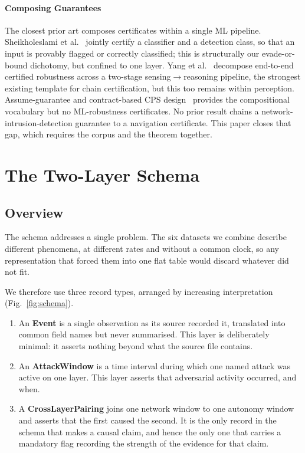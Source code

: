 \paragraph{Composing Guarantees}
The closest prior art composes certificates within a single ML pipeline.
Sheikholeslami et al.~\cite{sheikholeslami2021provably} jointly certify a
classifier and a detection class, so that an input is provably flagged or
correctly classified; this is structurally our evade-or-bound dichotomy, but
confined to one layer. Yang et al.~\cite{yang2022sensing} decompose end-to-end
certified robustness across a two-stage sensing$\to$reasoning pipeline, the
strongest existing template for chain certification, but this too remains within
perception. Assume-guarantee and contract-based CPS design~\cite{pacti2024}
provides the compositional vocabulary but no ML-robustness certificates. No
prior result chains a network-intrusion-detection guarantee to a navigation
certificate. This paper closes that gap, which requires the corpus and the
theorem together.

\section{The Two-Layer Schema}
\label{sec:schema}
\subsection{Overview}
The schema addresses a single problem. The six datasets we combine describe
different phenomena, at different rates and without a common clock, so any
representation that forced them into one flat table would discard whatever did
not fit.

We therefore use three record types, arranged by increasing
interpretation (Fig.~\ref{fig:schema}).

\begin{enumerate}
\item An \textbf{Event} is a single observation as its source recorded it,
translated into common field names but never summarised. This layer is
deliberately minimal: it asserts nothing beyond what the source file contains.
\item An \textbf{AttackWindow} is a time interval during which one named
attack was active on one layer. This layer asserts that adversarial activity
occurred, and when.
\item A \textbf{CrossLayerPairing} joins one network window to one autonomy
window and asserts that the first caused the second. It is the only record in
the schema that makes a causal claim, and hence the only one that carries a
mandatory flag recording the strength of the evidence for that claim.
\end{enumerate}

